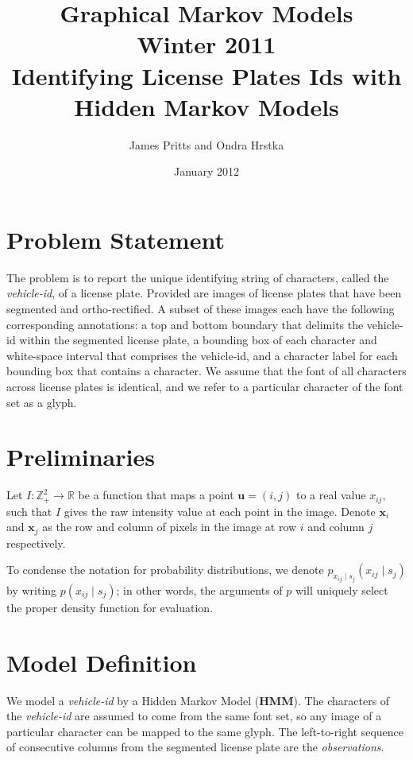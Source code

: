 \documentclass[a4paper,12pt]{article}
\title { \normalsize Graphical Markov Models \\ Winter 2011 \\
 \vspace{10mm} {\bf Identifying License Plates Ids with Hidden Markov
    Models } }
\author{\normalsize James Pritts and Ondra Hrstka }
\date{ \small January 2012 }
\renewcommand{\ohnote}[1]{} }
\begin{document}
\maketitle

\pagestyle{empty} \ohnote{This is useful way to leave notes. Both of
  us have command tu leave notes. I have \textbackslash ohnote, you
  have \textbackslash jpnote. Notes in whole document can be disabled
  by creating file with name ``.notes\_disabled''. }

\section{Problem Statement}
The problem is to report the unique identifying string of characters,
called the \emph{vehicle-id}, of a license plate.  Provided are images
of license plates that have been segmented and ortho-rectified. A
subset of these images each have the following corresponding
annotations: a top and bottom boundary that delimits the vehicle-id
within the segmented license plate, a bounding box of each character
and white-space interval that comprises the vehicle-id, and a
character label for each bounding box that contains a character.  We
assume that the font of all characters across license plates is
identical, and we refer to a particular character of the font set as a
glyph.

\section{Preliminaries}
Let $I\colon \mathbb{Z}^2_+ \to \mathbb{R}$ be a function that maps a
point $\mathbf{u} = (i,j)$ to a real value $x_{ij}$, such that $I$
gives the raw intensity value at each point in the image.  Denote
$\mathbf{x}_i$ and $\mathbf{x}_j$ as the row and column of pixels in
the image at row $i$ and column $j$ respectively.

To condense the notation for probability distributions, we denote
$p_{x_{ij} \mid s_j}(x_{ij} \mid s_j)$ by writing $p(x_{ij} \mid
s_j)$; in other words, the arguments of $p$ will uniquely select the
proper density function for evaluation.

\section{Model Definition}
We model a \emph{vehicle-id} by a Hidden Markov Model (\textbf{HMM}).
The characters of the \emph{vehicle-id} are assumed to come from the
same font set, so any image of a particular character can be mapped to
the same glyph.  The left-to-right sequence of consecutive columns
from the segmented license plate are the \emph{observations}.
\end{document}
